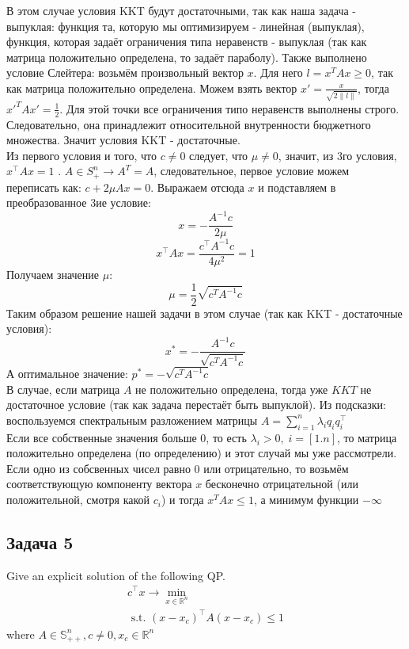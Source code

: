 \documentclass[a4paper,12pt]{article} %
\begin{document}
В этом случае условия KKT будут достаточными, так как наша задача - выпуклая: функция та, которую мы оптимизируем - линейная (выпуклая), функция, которая задаёт ограничения типа неравенств - выпуклая (так как матрица положительно определена, то задаёт параболу). Также выполнено условие Слейтера: возьмём произвольный вектор $ x $. Для него $ l = x^T A x \geq 0 $, так как матрица положительно определена. Можем взять вектор $ x' = \frac{x}{ \sqrt{2 \| l \|}} $, тогда $ x'^T A x' = \frac{1}{2} $. Для этой точки все ограничения типо неравенств выполнены строго. Следовательно, она принадлежит относительной внутренности бюджетного множества. Значит условия KKT - достаточные.\\

Из первого условия и того, что $ c \neq 0 $ следует, что $ \mu \neq 0 $, значит, из 3го условия, $ x^{\top} A x = 1 $ . $ A \in S^n_+ \rightarrow A^T = A $, следовательное, первое условие можем переписать как: $c+2 \mu A x=0$. Выражаем отсюда $ x $ и подставляем в преобразованное 3ие условие:
$$
x=-\frac{A^{-1} c}{2 \mu}
$$
$$
x^{\top} A x=\frac{c^{\top} A^{-1} c}{4 \mu^{2}}=1
$$
Получаем значение $ \mu $:
$$
\mu=\frac{1}{2} \sqrt{c^{T} A^{-1} c}
$$
Таким образом решение нашей задачи в этом случае (так как KKT - достаточные условия): 
$$
x^{*}=-\frac{A^{-1} c}{\sqrt{c^{T} A^{-1} c}}
$$
А оптимальное значение: $ p^* = -\sqrt{c^{T} A^{-1} c} $\\

В случае, если матрица $ A $ не положительно определена, тогда уже $ KKT $ не достаточное условие (так как задача перестаёт быть выпуклой). Из подсказки: воспользуемся спектральным разложением матрицы $A=\sum\limits_{i=1}^{n} \lambda_{i} q_{i} q_{i}^{\top}$\\

Если все собственные значения больше 0, то есть $ \lambda_{i} > 0, \; i = [1. n] $, то матрица положительно определена (по определению) и этот случай мы уже рассмотрели.\\
Если одно из собсвенных чисел равно 0 или отрицательно, то возьмём соответствующую компоненту вектора $ x $ бесконечно отрицательной (или положительной, смотря какой $ c_i $) и тогда $ x^T A x \leq 1 $, а минимум функции $ -\infty $


\subsection*{Задача 5}
Give an explicit solution of the following QP.
$$
\begin{array}{c}
c^{\top} x \rightarrow \min\limits _{x \in \mathbb{R}^{n}} \\
\text { s.t. }\left(x-x_{c}\right)^{\top} A\left(x-x_{c}\right) \leq 1
\end{array}
$$
where $A \in \mathbb{S}_{++}^{n}, c \neq 0, x_{c} \in \mathbb{R}^{n}$\\
\end{document}
